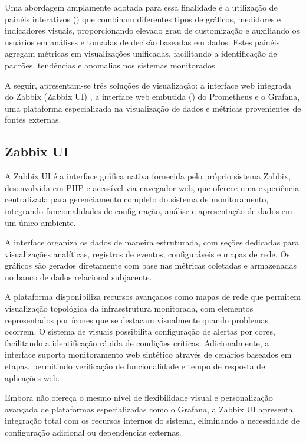 Uma abordagem amplamente adotada para essa finalidade é a utilização de painéis interativos () que combinam diferentes tipos de gráficos, medidores e indicadores visuais, proporcionando elevado grau de customização e auxiliando os usuários em análises e tomadas de decisão baseadas em dados. Estes painéis agregam métricas em visualizações unificadas, facilitando a identificação de padrões, tendências e anomalias nos sistemas monitorados

A seguir, apresentam-se três soluções de visualização: a interface web integrada do Zabbix (Zabbix UI) , a interface web embutida () do Prometheus  e o Grafana, uma plataforma especializada na visualização de dados e métricas provenientes de fontes externas.

\subsection{Zabbix UI}
\label{subsection:ZabbixUI}

A Zabbix UI \citep{zabbix2025} é a interface gráfica nativa fornecida pelo próprio sistema Zabbix, desenvolvida em PHP e acessível via navegador web, que oferece uma experiência centralizada para gerenciamento completo do sistema de monitoramento, integrando funcionalidades de configuração, análise e apresentação de dados em um único ambiente.

A interface organiza os dados de maneira estruturada, com seções dedicadas para visualizações analíticas, registros de eventos,  configuráveis e mapas de rede. Os gráficos são gerados diretamente com base nas métricas coletadas e armazenadas no banco de dados relacional subjacente.

A plataforma disponibiliza recursos avançados como mapas de rede que permitem visualização topológica da infraestrutura monitorada, com elementos representados por ícones que se destacam visualmente quando problemas ocorrem. O sistema de  visuais possibilita configuração de alertas por cores, facilitando a identificação rápida de condições críticas. Adicionalmente, a interface suporta monitoramento web sintético através de cenários baseados em etapas, permitindo verificação de funcionalidade e tempo de resposta de aplicações web.

Embora não ofereça o mesmo nível de flexibilidade visual e personalização avançada de plataformas especializadas como o Grafana, a Zabbix UI apresenta integração total com os recursos internos do sistema, eliminando a necessidade de configuração adicional ou dependências externas.

